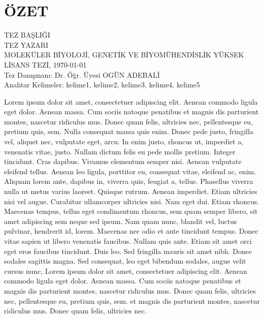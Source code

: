 \chapter*{\vspace{-4\baselineskip} \bf ÖZET} 
\begin{otherlanguage}{turkish}
\begin{center}
\MakeUppercase{Tez Başlığı} \\[3\baselineskip]
\MakeUppercase{Tez Yazarı} \\[\baselineskip]
MOLEKÜLER BİYOLOJİ, GENETİK VE BİYOMÜHENDİSLİK YÜKSEK LİSANS TEZİ, \Cemdateformat\today \\[\baselineskip]
Tez Danışmanı: Dr. Öğr. Üyesi OGÜN ADEBALİ \\[2\baselineskip]
Anahtar Kelimeler: kelime1, kelime2, kelime3, kelime4, kelime5 \\[2\baselineskip]
\end{center}

\singlespacing
Lorem ipsum dolor sit amet, consectetuer adipiscing elit. Aenean commodo ligula eget dolor. Aenean massa. Cum sociis natoque penatibus et magnis dis parturient montes, nascetur ridiculus mus. Donec quam felis, ultricies nec, pellentesque eu, pretium quis, sem. Nulla consequat massa quis enim. Donec pede justo, fringilla vel, aliquet nec, vulputate eget, arcu. In enim justo, rhoncus ut, imperdiet a, venenatis vitae, justo. Nullam dictum felis eu pede mollis pretium. Integer tincidunt. Cras dapibus. Vivamus elementum semper nisi. Aenean vulputate eleifend tellus. Aenean leo ligula, porttitor eu, consequat vitae, eleifend ac, enim. Aliquam lorem ante, dapibus in, viverra quis, feugiat a, tellus. Phasellus viverra nulla ut metus varius laoreet. Quisque rutrum. Aenean imperdiet. Etiam ultricies nisi vel augue. Curabitur ullamcorper ultricies nisi. Nam eget dui. Etiam rhoncus. Maecenas tempus, tellus eget condimentum rhoncus, sem quam semper libero, sit amet adipiscing sem neque sed ipsum. Nam quam nunc, blandit vel, luctus pulvinar, hendrerit id, lorem. Maecenas nec odio et ante tincidunt tempus. Donec vitae sapien ut libero venenatis faucibus. Nullam quis ante. Etiam sit amet orci eget eros faucibus tincidunt. Duis leo. Sed fringilla mauris sit amet nibh. Donec sodales sagittis magna. Sed consequat, leo eget bibendum sodales, augue velit cursus nunc, Lorem ipsum dolor sit amet, consectetuer adipiscing elit. Aenean commodo ligula eget dolor. Aenean massa. Cum sociis natoque penatibus et magnis dis parturient montes, nascetur ridiculus mus. Donec quam felis, ultricies nec, pellentesque eu, pretium quis, sem. et magnis dis parturient montes, nascetur ridiculus mus. Donec quam felis, ultricies nec.

\end{otherlanguage}

\clearpage\pagebreak
\onehalfspacing